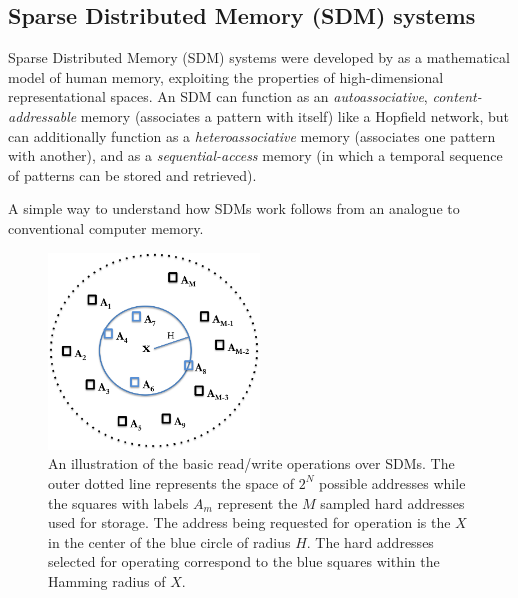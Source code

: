 \documentclass[10pt,letterpaper]{article}
\begin{document}
\subsection{Sparse Distributed Memory (SDM) systems}

Sparse Distributed Memory (SDM) systems were developed by  as a mathematical model of human memory, exploiting the properties of high-dimensional representational spaces.
An SDM can function as an \textit{autoassociative}, \textit{content-addressable} memory (associates a pattern with itself) like a Hopfield network, but can additionally function as a \textit{heteroassociative} memory (associates one pattern with another), and as a \textit{sequential-access} memory (in which a temporal sequence of patterns can be stored and retrieved).

A simple way to understand how SDMs work follows from an analogue to conventional computer memory.


\begin{figure}[ht!]
\begin{center}
\includegraphics[width=0.5\textwidth]{./figures/sdmOperations.png}

\end{center}
\caption{An illustration of the basic read/write operations over SDMs. The outer dotted line represents the space of $2^{N}$ possible addresses while the squares with labels $A_{m}$ represent the $M$ sampled hard addresses used for storage. The address being requested for operation is the $X$ in the center of the blue circle of radius $H$. The hard addresses selected for operating correspond to the blue squares within the Hamming radius of $X$.} 
\label{sdmBasics}
\end{figure}


\end{document}
